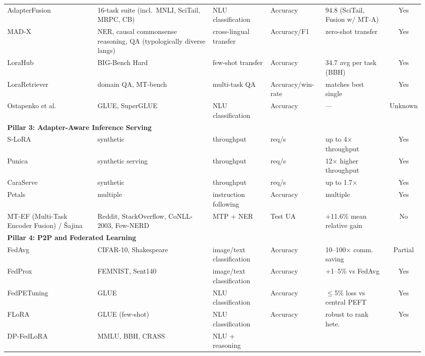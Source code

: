 \begin{table}
{\begin{tabular}{lllllc}
  AdapterFusion~\cite{Pfeiffer2021fusion} & 16-task suite (incl.\ MNLI, SciTail,
  MRPC, CB) & NLU classification & Accuracy & 94.8 (SciTail, Fusion w/ MT-A) & Yes \\
  MAD-X~\cite{PfeifferMADX2020} & NER, causal commonsense reasoning, QA
  (typologically diverse langs) & cross-lingual transfer &
  Accuracy/F1 & zero-shot transfer & Yes \\
  LoraHub~\cite{Huang2023} & BIG-Bench Hard & few-shot transfer & Accuracy &
  34.7 avg per task (BBH) & Yes \\
  LoraRetriever~\cite{ZhaoLoraRetriever2024} & domain QA, MT-bench & multi-task
   QA & Accuracy/win-rate & matches best single & Yes \\
  Ostapenko et al.~\cite{Ostapenko2024} & GLUE, SuperGLUE & NLU classification &
  Accuracy & --- & Unknown \\
  \midrule
  \multicolumn{6}{l}{\textbf{Pillar 3: Adapter-Aware Inference Serving}} \\
  S-LoRA~\cite{Sheng2024} & synthetic & throughput & req/s & up to 4$\times$
  throughput & Yes \\
  Punica~\cite{Chen2023Punica} & synthetic serving & throughput & req/s &
  12$\times$ higher throughput & Yes \\
  CaraServe~\cite{Li2024CaraServe} & synthetic & throughput & req/s &
  up to 1.7$\times$ & Yes \\
  Petals~\cite{Borzunov2023} & multiple & instruction following & Accuracy &
  multiple & Yes \\
  MT-EF (Multi-Task Encoder Fusion) / {\v{S}}ajina~\cite{Sajina2024} & Reddit, StackOverflow, CoNLL-2003,
  Few-NERD & MTP + NER & Test UA & +11.6\% mean relative gain & No \\
  \midrule
  \multicolumn{6}{l}{\textbf{Pillar 4: P2P and Federated Learning}} \\
  FedAvg~\cite{McMahan2017} & CIFAR-10, Shakespeare & image/text classification
   & Accuracy & 10--100$\times$ comm. saving & Partial \\
  FedProx~\cite{Li2020FedProx} & FEMNIST, Sent140 & image/text classification &
   Accuracy & +1--5\% vs FedAvg & Yes \\
  FedPETuning~\cite{ZhangFedPETuning2023} & GLUE & NLU classification &
  Accuracy & $\leq$5\% loss vs central PEFT & Yes \\
  FLoRA~\cite{WangFLoRA2024} & GLUE (few-shot) & NLU classification & Accuracy
  & robust to rank hete. & Yes \\
  DP-FedLoRA~\cite{XuDPFedLoRA2025} & MMLU, BBH, CRASS & NLU + reasoning &

\end{tabular}}
\end{table}
